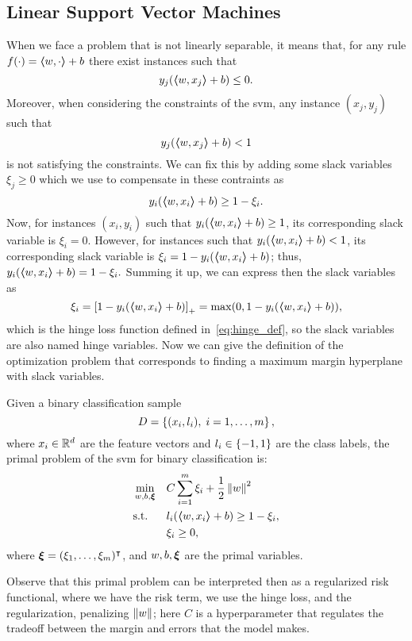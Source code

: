 \subsection{Linear Support Vector Machines}
%
When we face a problem that is not linearly separable, it means that, for any rule $f(\cdot) = \bm{\left\langle} w, \cdot \bm{\right\rangle} + b$ there exist instances such that 
$$ y_j (\bm{\left\langle} w, x_j \bm{\right\rangle} + b) \leq 0 .$$
Moreover, when considering the constraints of the \acrshort{svm}, any instance $(x_j, y_j)$ such that 
$$ y_j (\bm{\left\langle} w, x_j \bm{\right\rangle} + b) < 1 $$
is not satisfying the constraints.
%
We can fix this by adding some slack variables $\xi_j \geq 0$ which we use to compensate in these contraints as
$$ y_i (\bm{\left\langle} w, x_i \bm{\right\rangle} + b) \geq 1 - \xi_i. $$
Now, for instances $(x_i, y_i)$ such that $y_i (\bm{\left\langle} w, x_i \bm{\right\rangle} + b) \geq 1$, its corresponding slack variable is $\xi_i = 0$. However, for instances such that $y_i (\bm{\left\langle} w, x_i \bm{\right\rangle} + b) < 1$, its corresponding slack variable is $\xi_i = 1 - y_i (\bm{\left\langle} w, x_i \bm{\right\rangle} + b)$; thus, $y_i (\bm{\left\langle} w, x_i \bm{\right\rangle} + b) = 1 - \xi_i .$
Summing it up, we can express then the slack variables as 
\begin{equation}
    \nonumber
    \xi_i = \left[1 - y_i (\bm{\left\langle} w, x_i \bm{\right\rangle} + b)\right]_{+} = \max(0, 1 - y_i (\bm{\left\langle} w, x_i \bm{\right\rangle} + b)),
\end{equation} 
which is the hinge loss function defined in~\eqref{eq:hinge_def}, so the slack variables are also named hinge variables. 
Now we can give the definition of the optimization problem that corresponds to finding a maximum margin hyperplane with slack variables.
\begin{definition}
    Given a binary classification sample
    $$ D = \left\{(x_i, l_i), \; i=1, \ldots, m\right\} ,$$
    where $x_i \in \mathbb{R}^d$ are the feature vectors and $l_i \in \left\{-1, 1\right\}$ are the class labels, 
    the primal problem of the \acrshort{svm} for binary classification is:
    \begin{equation}
        \label{eq:linear_primal_clas}
        \begin{aligned}
            &\min_{w, b, \fv{\xi}} & & C \sum_{i=1}^m \xi_i + \frac{1}{2} \norm{w}^2 \\
            & \text{s.t.} & & l_i (\dotp{w}{x_i} + b) \geq 1 - \xi_i , \\
            & & & \xi_i \geq 0 ,      
        \end{aligned}  
    \end{equation}
    where $\bm{\xi} = (\xi_1, \ldots, \xi_m)^\intercal$, and $w, b, \bm{\xi}$ are the primal variables.
\end{definition}
Observe that this primal problem can be interpreted then as a regularized risk functional, where we have the risk term, we use the hinge loss, and the regularization, penalizing $\left\lVert w\right\rVert$; here $C$ is a hyperparameter that regulates the tradeoff between the margin and errors that the model makes.

